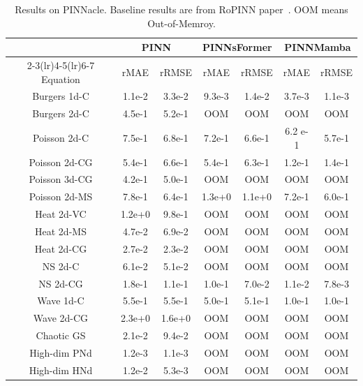 \documentclass{article}
\theoremstyle{plain}
\theoremstyle{definition}
\theoremstyle{remark}
\begin{document}
\begin{table}[H]
\vspace{-3mm}
  \caption{Results on PINNacle. Baseline results are from RoPINN paper~\cite{wu2024ropinn}. OOM means Out-of-Memroy.}
  
  \centering
    \small
  \begin{tabular}{c|cc|cc|cc}

    \toprule 
      &\multicolumn{2}{c}{PINN }&\multicolumn{2}{c}{PINNsFormer}&\multicolumn{2}{c}{PINNMamba}\\
    \cmidrule(lr){2-3}\cmidrule(lr){4-5}\cmidrule(lr){6-7}
   Equation & rMAE & rRMSE & rMAE & rRMSE & rMAE & rRMSE\\
   \midrule
   Burgers 1d-C &1.1e-2& 3.3e-2 & 9.3e-3 & 1.4e-2 & 3.7e-3 & 1.1e-3 \\
 Burgers 2d-C & 4.5e-1& 5.2e-1&  OOM & OOM & OOM & OOM \\
 Poisson 2d-C & 7.5e-1 & 6.8e-1 & 7.2e-1 & 6.6e-1 & 6.2 e-1 & 5.7e-1 \\
Poisson 2d-CG & 5.4e-1 & 6.6e-1 & 5.4e-1& 6.3e-1 & 1.2e-1 & 1.4e-1 \\
Poisson 3d-CG & 4.2e-1 & 5.0e-1 & OOM& OOM & OOM & OOM \\
Poisson 2d-MS & 7.8e-1 & 6.4e-1 & 1.3e+0& 1.1e+0 & 7.2e-1& 6.0e-1 \\
Heat 2d-VC & 1.2e+0 & 9.8e-1 & OOM& OOM &OOM &OOM  \\
Heat 2d-MS & 4.7e-2 & 6.9e-2 &OOM & OOM &OOM &OOM  \\
Heat 2d-CG & 2.7e-2 & 2.3e-2 & OOM& OOM &OOM &OOM  \\
NS 2d-C & 6.1e-2 & 5.1e-2 & OOM& OOM & OOM& OOM \\
NS 2d-CG & 1.8e-1 & 1.1e-1 & 1.0e-1& 7.0e-2 & 1.1e-2& 7.8e-3  \\
Wave 1d-C & 5.5e-1 & 5.5e-1 & 5.0e-1 & 5.1e-1 & 1.0e-1 & 1.0e-1 \\ 
Wave 2d-CG & 2.3e+0 & 1.6e+0 &OOM & OOM  &OOM &OOM  \\
Chaotic GS & 2.1e-2 & 9.4e-2 & OOM& OOM & OOM &OOM  \\
High-dim PNd & 1.2e-3 & 1.1e-3 &OOM &OOM  &OOM &OOM  \\
High-dim HNd & 1.2e-2 & 5.3e-3 &OOM &OOM  &OOM &OOM  \\
   

    \bottomrule
  \end{tabular}
  \normalsize
  \label{tab:pinnacle}

\end{table}



\end{document}
